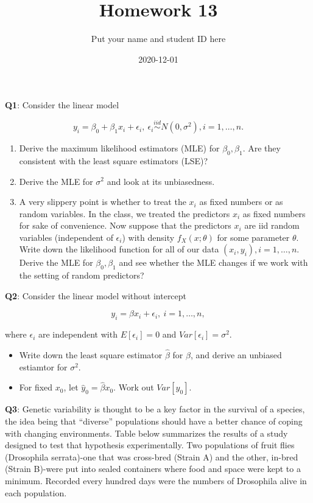 \documentclass[]{article}
\title{Homework 13}
\author{Put your name and student ID here}
\date{2020-12-01}
\begin{document}
\maketitle

\textbf{Q1}: Consider the linear model

\[y_i=\beta_0+\beta_1x_i+\epsilon_i,\ \epsilon_i\stackrel{iid}{\sim} N(0,\sigma^2), i=1,\dots,n.\]

\begin{enumerate}
\def\labelenumi{\arabic{enumi}.}
\item
  Derive the maximum likelihood estimators (MLE) for
  \(\beta_0,\beta_1\). Are they consistent with the least square
  estimators (LSE)?
\item
  Derive the MLE for \(\sigma^2\) and look at its unbiasedness.
\item
  A very slippery point is whether to treat the \(x_i\) as fixed numbers
  or as random variables. In the class, we treated the predictors
  \(x_i\) as fixed numbers for sake of convenience. Now suppose that the
  predictors \(x_i\) are iid random variables (independent of
  \(\epsilon_i\)) with density \(f_X(x;\theta)\) for some parameter
  \(\theta\). Write down the likelihood function for all of our data
  \((x_i,y_i),i=1,\dots,n\). Derive the MLE for \(\beta_0,\beta_1\) and
  see whether the MLE changes if we work with the setting of random
  predictors?
\end{enumerate}

\textbf{Q2}: Consider the linear model without intercept

\[y_i  = \beta x_i+\epsilon_i,\ i=1,\dots,n,\]

where \(\epsilon_i\) are independent with \(E[\epsilon_i]=0\) and
\(Var[\epsilon_i]=\sigma^2\).

\begin{itemize}
\item
  Write down the least square estimator \(\hat \beta\) for \(\beta\),
  and derive an unbiased estiamtor for \(\sigma^2\).
\item
  For fixed \(x_0\), let \(\hat{y}_0=\hat\beta x_0\). Work out
  \(Var[\hat{y}_0]\).
\end{itemize}

\textbf{Q3}: Genetic variability is thought to be a key factor in the
survival of a species, the idea being that ``diverse'' populations
should have a better chance of coping with changing environments. Table
below summarizes the results of a study designed to test that hypothesis
experimentally. Two populations of fruit flies (Drosophila serrata)-one
that was cross-bred (Strain A) and the other, in-bred (Strain B)-were
put into sealed containers where food and space were kept to a minimum.
Recorded every hundred days were the numbers of Drosophila alive in each
population.
\end{document}
